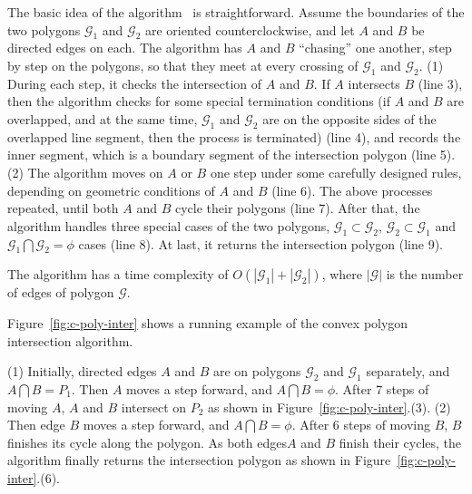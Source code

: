The basic idea of the algorithm~\cite{ORourke:Intersection} is straightforward. Assume the boundaries of the two polygons $\mathcal{G}_1$ and $\mathcal{G}_2$ are oriented counterclockwise, and let $A$ and $B$ be directed edges on each. The algorithm has $A$ and $B$ ``chasing'' one another, step by step on the polygons, so that they meet at every crossing of $\mathcal{G}_1$ and $\mathcal{G}_2$.
%
(1) During each step, it checks the intersection of $A$ and $B$. If $A$ intersects $B$ (line 3), then the algorithm checks for some special termination conditions (\eg if $A$ and $B$ are overlapped, and at the same time, $\mathcal{G}_1$ and $\mathcal{G}_2$ are on the opposite sides of the overlapped line segment, then the process is terminated) (line 4), and records the inner segment, which is a boundary segment of the intersection polygon (line 5).
%
(2) The algorithm moves on $A$ or $B$ one step under some carefully designed rules, depending on geometric conditions of $A$ and $B$ (line 6).
The above processes repeated, until both $A$ and $B$ cycle their polygons (line 7).
%
After that, the algorithm handles three special cases of the two polygons, \ie $\mathcal{G}_1 \subset \mathcal{G}_2$, $\mathcal{G}_2 \subset \mathcal{G}_1$ and $\mathcal{G}_1 \bigcap \mathcal{G}_2 = \phi$ cases (line 8).
%
At last, it returns the intersection polygon (line 9).

The algorithm has a time complexity of $O(|\mathcal{G}_1| + |\mathcal{G}_2|)$, where $|\mathcal{G}|$ is the number of edges of polygon $\mathcal{G}$.





\begin{example}
Figure~\ref{fig:c-poly-inter} shows a running example of the convex polygon intersection algorithm.

(1) Initially, directed edges $A$ and $B$ are on polygons $\mathcal{G}_2$ and $\mathcal{G}_1$ separately, and $A \bigcap B = P_1$. Then $A$ moves  a step forward, and $A \bigcap B = \phi$. After 7 steps of moving $A$, $A$ and $B$ intersect on $P_2$  as shown in Figure~\ref{fig:c-poly-inter}.(3).
%
(2) Then edge $B$ moves  a step forward, and $A \bigcap B = \phi$. After 6 steps of moving $B$, $B$ finishes its cycle along the polygon.
%
As both edges$A$ and $B$ finish their cycles, the algorithm finally returns the intersection polygon as shown in Figure~\ref{fig:c-poly-inter}.(6).
\end{example}


